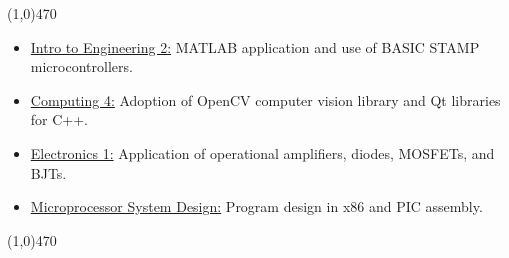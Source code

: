 \documentclass[11pt]{article} %
\begin{document}
\noindent \line(1,0){470}\\

\begin{itemize}
\itemsep0em
	\item \underline{Intro to Engineering 2:} MATLAB application and use of BASIC STAMP microcontrollers.	
	\item \underline{Computing 4:} Adoption of OpenCV computer vision library and Qt libraries for C++.
	\item \underline{Electronics 1:} Application of operational amplifiers, diodes, MOSFETs, and BJTs.
	\item \underline{Microprocessor System Design:} Program design in x86 and PIC assembly.
\end{itemize}

\noindent \line(1,0){470} \\
\end{document}
